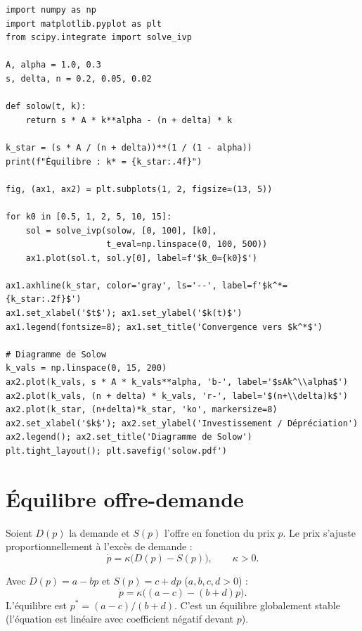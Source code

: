 \begin{codeblock}[title=\textbf{Simulation du mod\`ele de Solow}]
\begin{verbatim}
import numpy as np
import matplotlib.pyplot as plt
from scipy.integrate import solve_ivp

A, alpha = 1.0, 0.3
s, delta, n = 0.2, 0.05, 0.02

def solow(t, k):
    return s * A * k**alpha - (n + delta) * k

k_star = (s * A / (n + delta))**(1 / (1 - alpha))
print(f"Équilibre : k* = {k_star:.4f}")

fig, (ax1, ax2) = plt.subplots(1, 2, figsize=(13, 5))

for k0 in [0.5, 1, 2, 5, 10, 15]:
    sol = solve_ivp(solow, [0, 100], [k0],
                    t_eval=np.linspace(0, 100, 500))
    ax1.plot(sol.t, sol.y[0], label=f'$k_0={k0}$')

ax1.axhline(k_star, color='gray', ls='--', label=f'$k^*={k_star:.2f}$')
ax1.set_xlabel('$t$'); ax1.set_ylabel('$k(t)$')
ax1.legend(fontsize=8); ax1.set_title('Convergence vers $k^*$')

# Diagramme de Solow
k_vals = np.linspace(0, 15, 200)
ax2.plot(k_vals, s * A * k_vals**alpha, 'b-', label='$sAk^\\alpha$')
ax2.plot(k_vals, (n + delta) * k_vals, 'r-', label='$(n+\\delta)k$')
ax2.plot(k_star, (n+delta)*k_star, 'ko', markersize=8)
ax2.set_xlabel('$k$'); ax2.set_ylabel('Investissement / Dépréciation')
ax2.legend(); ax2.set_title('Diagramme de Solow')
plt.tight_layout(); plt.savefig('solow.pdf')
\end{verbatim}
\end{codeblock}

\section{\'Equilibre offre-demande}
\label{sec:offre_demande}

\begin{definition}
Soient $D(p)$ la demande et $S(p)$ l'offre en fonction du prix $p$.
Le prix s'ajuste proportionnellement \`a l'exc\`es de demande :
\[
  \dot{p} = \kappa\bigl(D(p) - S(p)\bigr), \qquad \kappa > 0.
\]
\end{definition}

\begin{exemple}
Avec $D(p)=a-bp$ et $S(p)=c+dp$ ($a,b,c,d>0$) :
\[
  \dot{p} = \kappa\bigl((a-c)-(b+d)p\bigr).
\]
L'\'equilibre est $p^* = (a-c)/(b+d)$.  C'est un \'equilibre
globalement stable (l'\'equation est lin\'eaire avec coefficient
n\'egatif devant $p$).
\end{exemple}

